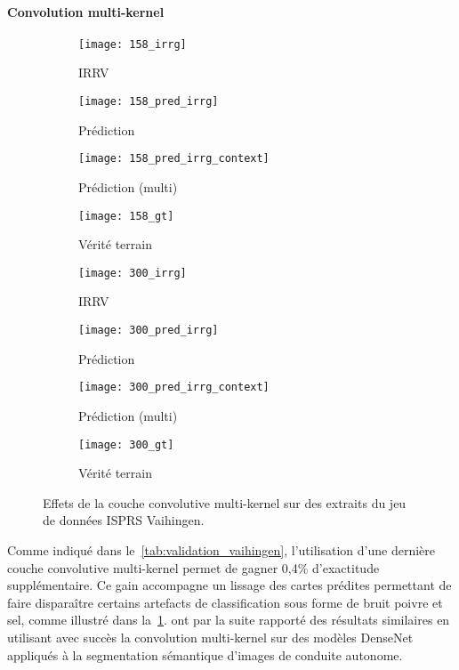 \paragraph{Convolution multi-kernel}
\begin{figure}[t]
  \captionsetup[subfigure]{singlelinecheck=off,justification=centering}
  \captionsetup[subfigure]{labelformat=empty}
  \begin{subfigure}[t]{0.125\textwidth}
    \texttt{[image: 158\_irrg]}
    \caption{\gls{IRRV}}
  \end{subfigure}%
  \begin{subfigure}[t]{0.125\textwidth}
    \texttt{[image: 158\_pred\_irrg]}
    \caption{Prédiction}
  \end{subfigure}%
  \begin{subfigure}[t]{0.125\textwidth}
    \texttt{[image: 158\_pred\_irrg\_context]}
    \caption{Prédiction (multi)}
  \end{subfigure}%
  \begin{subfigure}[t]{0.125\textwidth}
    \texttt{[image: 158\_gt]}
    \caption{Vérité terrain}
  \end{subfigure}%
	\begin{subfigure}[t]{0.125\textwidth}
		\texttt{[image: 300\_irrg]}
		\caption{\gls{IRRV}}
	\end{subfigure}%
	\begin{subfigure}[t]{0.125\textwidth}
		\texttt{[image: 300\_pred\_irrg]}
		\caption{Prédiction}
	\end{subfigure}%
	\begin{subfigure}[t]{0.125\textwidth}
		\texttt{[image: 300\_pred\_irrg\_context]}
		\caption{Prédiction (multi)}
	\end{subfigure}%
	\begin{subfigure}[t]{0.125\textwidth}
		\texttt{[image: 300\_gt]}
		\caption{Vérité terrain}
	\end{subfigure}
  \caption{Effets de la couche convolutive multi-kernel sur des extraits du jeu de données ISPRS Vaihingen.\\
	\isprslegende}
  \label{fig:patches_context}
\end{figure}

Comme indiqué dans le~\cref{tab:validation_vaihingen}, l'utilisation d'une dernière couche convolutive multi-kernel permet de gagner 0,4\% d'exactitude supplémentaire. Ce gain accompagne un lissage des cartes prédites permettant de faire disparaître certains artefacts de classification sous forme de bruit poivre et sel, comme illustré dans la~\cref{fig:patches_context}.
\citet{brahimi_multiscale_2018} ont par la suite rapporté des résultats similaires en utilisant avec succès la convolution multi-kernel sur des modèles DenseNet appliqués à la segmentation sémantique d'images de conduite autonome.

